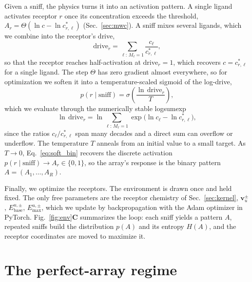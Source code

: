 \documentclass[aps,pre,superscriptaddress,floatfix,longbibliography,linenumbers]{revtex4-2}
\begin{document}
Given a sniff, the physics turns it into an activation pattern. A single
ligand activates receptor $r$ once its concentration exceeds the threshold,
$A_r=\Theta(\ln c-\ln c^*_{r,\ell})$ (Sec.~\ref{sec:mwc}). A sniff mixes
several ligands, which we combine into the receptor's drive,
\begin{equation}
\text{drive}_r = \sum_{\ell:\,M_\ell=1} \frac{c_\ell}{c^*_{r,\ell}},
\label{eq:drive}
\end{equation}
so that the receptor reaches half-activation at $\text{drive}_r=1$, which
recovers $c=c^*_{r,\ell}$ for a single ligand. The step $\Theta$ has zero
gradient almost everywhere, so for optimization we soften it into a
temperature-scaled sigmoid of the log-drive,
\begin{equation}
p(r\mid\text{sniff}) = \sigma\!\left(\frac{\ln\,\text{drive}_r}{T}\right),
\label{eq:soft_bin}
\end{equation}
which we evaluate through the numerically stable logsumexp
\begin{equation}
\ln\,\text{drive}_r = \ln\sum_{\ell:\,M_\ell=1} \exp\bigl(\ln c_\ell - \ln c^*_{r,\ell}\bigr),
\label{eq:logsumexp}
\end{equation}
since the ratios $c_\ell/c^*_{r,\ell}$ span many decades and a direct sum
can overflow or underflow. The temperature $T$ anneals from an initial
value to a small target. As $T\to0$, Eq.~\eqref{eq:soft_bin} recovers the
discrete activation $p(r\mid\text{sniff})\to A_r\in\{0,1\}$, so the array's
response is the binary pattern $A=(A_1,\dots,A_R)$.

Finally, we optimize the receptors. The environment is drawn once and held
fixed. The only free parameters are the receptor chemistry of
Sec.~\ref{sec:kernel}, $\mathbf v_u^{\pm}$, $E_\text{base}^{u,\pm}$,
$E_\text{max}^{u,\pm}$, which we update by backpropagation with the Adam
optimizer in PyTorch. Fig.~\ref{fig:env}\textbf{C} summarizes the loop:
each sniff yields a pattern $A$, repeated sniffs build the distribution
$p(A)$ and its entropy $H(A)$, and the receptor coordinates are moved to
maximize it.

\section{The perfect-array regime}
\label{sec:perfect}
\end{document}
